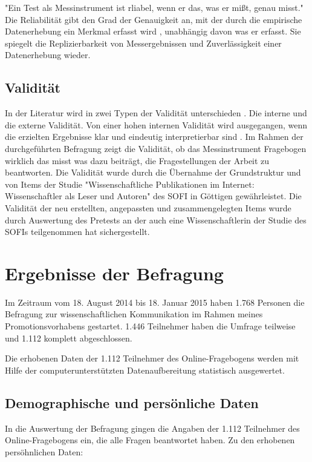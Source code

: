 "Ein Test als Messinstrument ist rliabel, wenn er das, was er mißt, genau misst." \cite{schelten_1997_testbeurteilung} Die Reliabilität gibt den Grad der Genauigkeit an, mit der durch die empirische Datenerhebung ein Merkmal erfasst wird \cite{rost_2004_lehrbuch}, unabhängig davon was er erfasst. Sie spiegelt die Replizierbarkeit von Messergebnissen und Zuverlässigkeit einer Datenerhebung wieder.

\subsection{Validität}
In der Literatur wird in zwei Typen der Validität unterschieden \cite{rost_2004_lehrbuch}. Die interne und die externe Validität. Von einer hohen internen Validität wird ausgegangen, wenn die erzielten Ergebnisse klar und eindeutig interpretierbar sind \cite{raab_2012_fragebogen}. Im Rahmen der durchgeführten Befragung zeigt die Validität, ob das Messinstrument Fragebogen wirklich das misst was dazu beiträgt, die Fragestellungen der Arbeit zu beantworten. Die Validität wurde durch die Übernahme der Grundstruktur und von Items der Studie "Wissenschaftliche Publikationen im Internet: Wissenschaftler als Leser und Autoren" des SOFI in Göttigen gewährleistet. Die Validität der neu erstellten, angepassten  und zusammengelegten Items wurde durch Auswertung des Pretests an der auch eine Wissenschaftlerin der Studie des SOFIs teilgenommen hat sichergestellt.

\section{Ergebnisse der Befragung}

Im Zeitraum vom 18. August 2014 bis 18. Januar 2015 haben 1.768 Personen die Befragung zur wissenschaftlichen Kommunikation im Rahmen meines Promotionsvorhabens gestartet. 1.446 Teilnehmer haben die Umfrage teilweise und 1.112 komplett abgeschlossen.

Die erhobenen Daten der 1.112 Teilnehmer des Online-Fragebogens werden mit Hilfe der computerunterstützten Datenaufbereitung statistisch ausgewertet. 

\subsection{Demographische und persönliche Daten}

In die Auswertung der Befragung gingen die Angaben der 1.112 Teilnehmer des Online-Fragebogens ein, die alle Fragen beantwortet haben. Zu den erhobenen persöhnlichen Daten:

